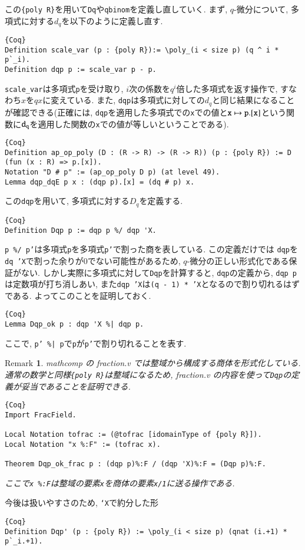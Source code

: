 \documentclass[11pt]{jsreport}
\theoremstyle{mystyle}
\newtheorem{rmk}[df]{$\textrm{Remark}$}
\newcommand{\brmk}{\begin{rmk}}
\newcommand{\ermk}{\end{rmk}}
\newcommand{\0}{\textbf{0}}
\begin{document}
この{\tt \{poly R\}}を用いて{\tt Dq}や{\tt qbinom}を定義し直していく. 
まず, $q$-微分について, 多項式に対する$d_q$を以下のように定義し直す. 
\begin{lstlisting}{Coq}
Definition scale_var (p : {poly R}):= \poly_(i < size p) (q ^ i * p`_i).
Definition dqp p := scale_var p - p. \end{lstlisting}
{\tt scale\_var}は多項式{\tt p}を受け取り, $i$次の係数を$q^i$倍した多項式を返す操作で, すなわち$x$を$qx$に変えている. また, {\tt dqp}は多項式に対しての$d_q$と同じ結果になることが確認できる(正確には, {\tt dqp}を適用した多項式での{\tt x}での値と${\tt x} \mapsto {\tt p.[x]}$という関数に${\tt d}_{\tt q}$を適用した関数の{\tt x}での値が等しいということである). 
\begin{lstlisting}{Coq}
Definition ap_op_poly (D : (R -> R) -> (R -> R)) (p : {poly R}) := D (fun (x : R) => p.[x]).
Notation "D # p" := (ap_op_poly D p) (at level 49).
Lemma dqp_dqE p x : (dqp p).[x] = (dq # p) x. \end{lstlisting}
この{\tt dqp}を用いて, 多項式に対する$D_q$を定義する. 
\begin{lstlisting}{Coq}
Definition Dqp p := dqp p %/ dqp 'X.
\end{lstlisting}
{\tt p \%/ p'}は多項式{\tt p}を多項式{\tt p'}で割った商を表している. この定義だけでは
{\tt dqp}を{\tt dq 'X}で割った余りが$0$でない可能性があるため, $q$-微分の正しい形式化である保証がない. しかし実際に多項式に対して{\tt Dqp}を計算すると, {\tt dqp}の定義から, {\tt dqp p}は定数項が打ち消しあい, また{\tt dqp 'X}は{\tt (q - 1) * 'X}となるので割り切れるはずである. 
よってこのことを証明しておく.  
\begin{lstlisting}{Coq}
Lemma Dqp_ok p : dqp 'X %| dqp p.
\end{lstlisting}
ここで, {\tt p' \%| p}で{\tt p}が{\tt p'}で割り切れることを表す. 
\brmk
  mathcomp の fraction.v では整域から構成する商体を形式化している. 
  通常の数学と同様{\tt \{poly R\}}は整域になるため, fraction.v の内容を使って{\tt Dqp}の定義が妥当であることを証明できる. 
  \begin{lstlisting}{Coq}
Import FracField.

Local Notation tofrac := (@tofrac [idomainType of {poly R}]).
Local Notation "x %:F" := (tofrac x).

Theorem Dqp_ok_frac p : (dqp p)%:F / (dqp 'X)%:F = (Dqp p)%:F.
\end{lstlisting}
ここで{\tt x \%:F}は整域の要素{\tt x}を商体の要素{\tt x/1}に送る操作である. 
\ermk
今後は扱いやすさのため, {\tt `X}で約分した形
\begin{lstlisting}{Coq}
Definition Dqp' (p : {poly R}) := \poly_(i < size p) (qnat (i.+1) * p`_i.+1).
\end{lstlisting}
\end{document}
